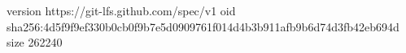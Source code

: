 version https://git-lfs.github.com/spec/v1
oid sha256:4d5f9f9ef330b0cb0f9b7e5d0909761f014d4b3b911afb9b6d74d3fb42eb694d
size 262240
